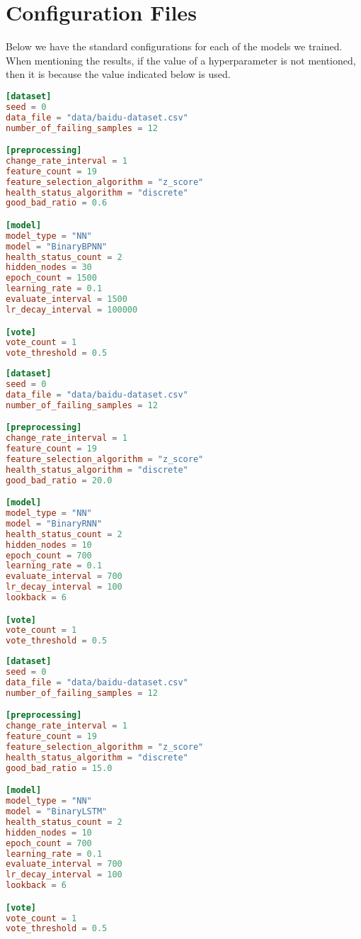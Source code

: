 \chapter{Configuration Files}\label{chap:config_files}

Below we have the standard configurations for each of the models we trained.
When mentioning the results, if the value of a hyperparameter is not mentioned, then it is because the value indicated below is used.

\begin{lstlisting}[language=Toml,caption={Default configuration file for a Binary BPNN}]
[dataset]
seed = 0
data_file = "data/baidu-dataset.csv"
number_of_failing_samples = 12

[preprocessing]
change_rate_interval = 1
feature_count = 19
feature_selection_algorithm = "z_score"
health_status_algorithm = "discrete"
good_bad_ratio = 0.6

[model]
model_type = "NN"
model = "BinaryBPNN"
health_status_count = 2
hidden_nodes = 30
epoch_count = 1500
learning_rate = 0.1
evaluate_interval = 1500
lr_decay_interval = 100000

[vote]
vote_count = 1
vote_threshold = 0.5
\end{lstlisting}

\newpage

\begin{lstlisting}[language=Toml,caption={Default configuration file for a Binary RNN}]
[dataset]
seed = 0
data_file = "data/baidu-dataset.csv"
number_of_failing_samples = 12

[preprocessing]
change_rate_interval = 1
feature_count = 19
feature_selection_algorithm = "z_score"
health_status_algorithm = "discrete"
good_bad_ratio = 20.0

[model]
model_type = "NN"
model = "BinaryRNN"
health_status_count = 2
hidden_nodes = 10
epoch_count = 700
learning_rate = 0.1
evaluate_interval = 700
lr_decay_interval = 100
lookback = 6

[vote]
vote_count = 1
vote_threshold = 0.5
\end{lstlisting}

\begin{lstlisting}[language=Toml,caption={Default configuration file for a Binary LSTM}]
[dataset]
seed = 0
data_file = "data/baidu-dataset.csv"
number_of_failing_samples = 12

[preprocessing]
change_rate_interval = 1
feature_count = 19
feature_selection_algorithm = "z_score"
health_status_algorithm = "discrete"
good_bad_ratio = 15.0

[model]
model_type = "NN"
model = "BinaryLSTM"
health_status_count = 2
hidden_nodes = 10
epoch_count = 700
learning_rate = 0.1
evaluate_interval = 700
lr_decay_interval = 100
lookback = 6

[vote]
vote_count = 1
vote_threshold = 0.5
\end{lstlisting}


